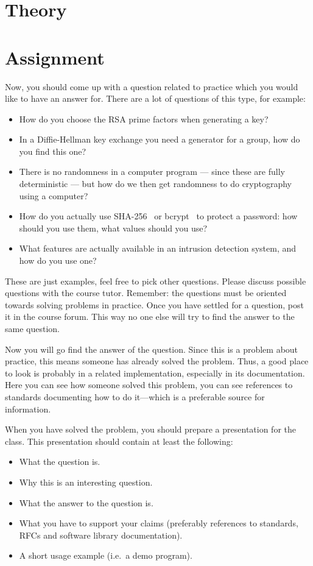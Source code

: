 \section{Theory}
\label{sec:theory}



\section{Assignment}
\label{sec:tasks}
Now, you should come up with a question related to practice which you would 
like to have an answer for.
There are a lot of questions of this type, for example:
\begin{itemize}
  \item How do you choose the RSA prime factors when generating a key?

  \item In a Diffie-Hellman key exchange you need a generator for a group, how 
    do you find this one?

  \item There is no randomness in a computer program --- since these are fully 
    deterministic --- but how do we then get randomness to do cryptography 
    using a computer?

  \item How do you actually use SHA-256~\cite{shs} or bcrypt~\cite{bcrypt} to 
    protect a password: how should you use them, what values should you use?

  \item What features are actually available in an intrusion detection system, 
    and how do you use one?

\end{itemize}
These are just examples, feel free to pick other questions.
Please discuss possible questions with the course tutor.
Remember: the questions must be oriented towards solving problems in practice.
Once you have settled for a question, post it in the course forum.
This way no one else will try to find the answer to the same question.

Now you will go find the answer of the question.
Since this is a problem about practice, this means someone has already solved 
the problem.
Thus, a good place to look is probably in a related implementation, especially 
in its documentation.
Here you can see how someone solved this problem, you can see references to 
standards documenting how to do it---which is a preferable source for 
information.

When you have solved the problem, you should prepare a presentation for the 
class.
This presentation should contain at least the following:
\begin{itemize}
  \item What the question is.
  \item Why this is an interesting question.
  \item What the answer to the question is.
  \item What you have to support your claims (preferably references to 
    standards, RFCs and software library documentation).
  \item A short usage example (i.e.~a demo program).
\end{itemize}



